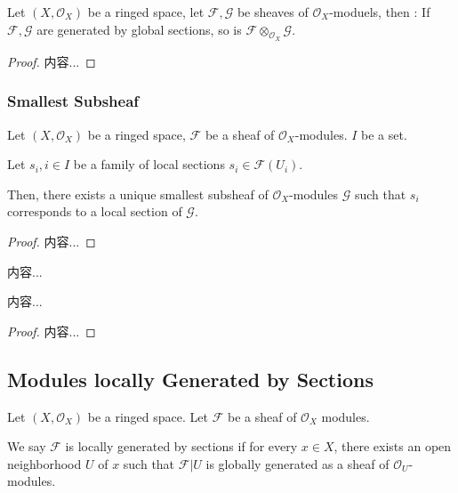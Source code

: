 \documentclass[Total.tex]{subfiles}
\begin{document}
			\begin{lemma}
				Let $(X,\mathcal{O}_X)$ be a ringed space, let $\mathcal{F},\mathcal{G}$ be sheaves of $\mathcal{O}_X$-moduels, then : If $\mathcal{F},\mathcal{G}$ are generated by global sections, so is $\mathcal{F}\otimes_{\mathcal{O}_X}\mathcal{G}$. 
			\end{lemma}
			
			\begin{proof}
				内容...
			\end{proof}
			
			\subsubsection{Smallest Subsheaf}
			\begin{lemma}
				Let $(X,\mathcal{O}_X)$ be a ringed space, $\mathcal{F}$ be a sheaf of $\mathcal{O}_X$-modules. $I$ be a set.
				
				Let $s_i,i\in I$ be a family of local sections $s_i\in \mathcal{F}(U_i)$. 
				
				Then, there exists a unique smallest subsheaf of $\mathcal{O}_X$-modules $\mathcal{G}$ such that $s_i$ corresponds to a local section of $\mathcal{G}$.
			\end{lemma}
			\begin{proof}
				内容...
			\end{proof}
			
			\begin{Def}
				内容...
			\end{Def}
			
			\begin{lemma}
				内容...
			\end{lemma}
			\begin{proof}
				内容...
			\end{proof}
		
			\subsection{Modules locally Generated by Sections}
			
			\begin{Def}
				Let $(X,\mathcal{O}_X)$ be a ringed space. Let $\mathcal{F}$ be a sheaf of $\mathcal{O}_X$ modules. 
				
				We say $\mathcal{F}$ is locally generated by sections if for every $x\in X$, there exists an open neighborhood $U$ of $x$ such that $\mathcal{F}|U$ is globally generated as a sheaf of $\mathcal{O}_U$-modules.
			\end{Def}
			\begin{center}
			\end{center}
			
\end{document}

